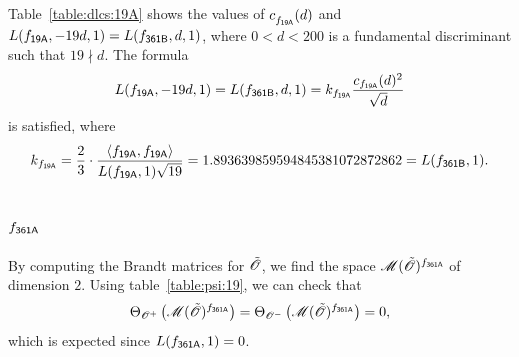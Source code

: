 Table~\ref{table:dlcs:19A} shows
the values of $c^{}_{f_\mathsf{{19A}}}(d)$
and $L(f_\mathsf{{19A}},-19d,1) = L(f_\mathsf{{361B}},d,1)$,
where $0<d<200$ is a fundamental discriminant
such that
$19\nmid d$.
The formula
\[
  L(f_\mathsf{{19A}},-19d,1) = L(f_\mathsf{{361B}},d,1)
  = k_{f_\mathsf{{19A}}} \frac{c_{f_\mathsf{{19A}}}(d)^2}{\sqrt{d}}
\]
is satisfied, where 
\[
  k_{\mf{19A}} = \frac{2}{3}\cdot
  \frac{\<\mf{19A},\mf{19A}>}
        {L(\mf{19A},1)\sqrt{19}}
  = 1.893639859594845381072872862  = L(\mf{361B},1).
\]
\subsection{$f_\mathsf{{361A}}$}
By computing the Brandt matrices for ${\tilde{{\mathscr{O}}}}$,
we find the space $\operatorname{{\mathscr M}}({\tilde{{\mathscr{O}}}})^{f_\mathsf{{361A}}}
$
of dimension $2$.
Using table~\ref{table:psi:19},
we can check that
\[
  {\Theta}_{{{\mathscr{O}}^+}}\left(\operatorname{{\mathscr M}}({\tilde{{\mathscr{O}}}})^{f_\mathsf{{361A}}}\right)  = 
  {\Theta}_{{{\mathscr{O}}^-}}\left(\operatorname{{\mathscr M}}({\tilde{{\mathscr{O}}}})^{f_\mathsf{{361A}}}\right)  = 0,
\]
which is expected since $L(f_\mathsf{{361A}},1)=0$.
